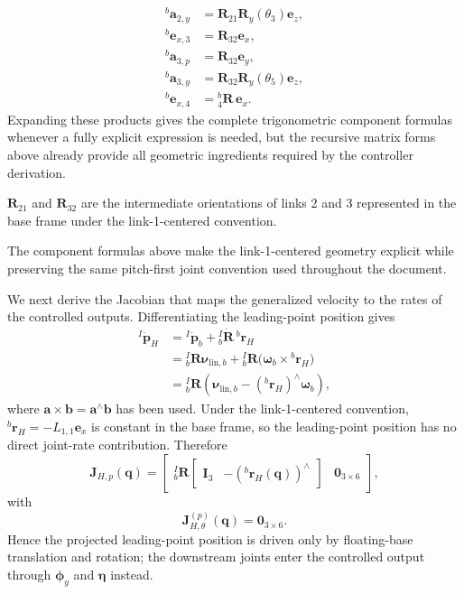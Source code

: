 \documentclass[12pt,a4paper]{report}
\newcommand{\newsymbols}[1]{\par\noindent{}#1\par\vspace{0.35em}}
\newcommand{\formulaannotation}[1]{\par\noindent{}#1\par\vspace{0.35em}}
\begin{document}
\begin{equation}
\begin{aligned}
{}^{b}\mathbf{a}_{2,y} &= \mathbf{R}_{21}\mathbf{R}_y(\theta_{3})\mathbf{e}_z, \\
{}^{b}\mathbf{e}_{x,3} &= \mathbf{R}_{32}\mathbf{e}_x, \\
{}^{b}\mathbf{a}_{3,p} &= \mathbf{R}_{32}\mathbf{e}_y, \\
{}^{b}\mathbf{a}_{3,y} &= \mathbf{R}_{32}\mathbf{R}_y(\theta_{5})\mathbf{e}_z, \\
{}^{b}\mathbf{e}_{x,4} &= {}_{4}^{b}\mathbf{R}\,\mathbf{e}_x.
\end{aligned}
\end{equation}
Expanding these products gives the complete trigonometric component formulas whenever a fully explicit expression is needed, but the recursive matrix forms above already provide all geometric ingredients required by the controller derivation.
\newsymbols{$\mathbf{R}_{21}$ and $\mathbf{R}_{32}$ are the intermediate orientations of links 2 and 3 represented in the base frame under the link-1-centered convention.}
\formulaannotation{The component formulas above make the link-1-centered geometry explicit while preserving the same pitch-first joint convention used throughout the document.}

We next derive the Jacobian that maps the generalized velocity to the rates of the controlled outputs. Differentiating the leading-point position gives
\begin{align}
{}^{I}\dot{\mathbf{p}}_H
&= {}^{I}\dot{\mathbf{p}}_b + {}_{b}^{I}\dot{\mathbf{R}}\,{}^{b}\mathbf{r}_H \\
&= {}_{b}^{I}\mathbf{R}\boldsymbol{\nu}_{\mathrm{lin},b} + {}_{b}^{I}\mathbf{R}\bigl(\boldsymbol{\omega}_b \times {}^{b}\mathbf{r}_H\bigr) \\
&= {}_{b}^{I}\mathbf{R}
\left(
\boldsymbol{\nu}_{\mathrm{lin},b} - ({}^{b}\mathbf{r}_H)^\wedge \boldsymbol{\omega}_b
\right),
\end{align}
where $\mathbf{a} \times \mathbf{b} = \mathbf{a}^\wedge \mathbf{b}$ has been used. Under the link-1-centered convention, ${}^{b}\mathbf{r}_H = -L_{1,1}\mathbf{e}_x$ is constant in the base frame, so the leading-point position has no direct joint-rate contribution. Therefore
\begin{equation}
\mathbf{J}_{H,p}(\mathbf{q}) =
\begin{bmatrix}
{}_{b}^{I}\mathbf{R}
\begin{bmatrix}
\mathbf{I}_3 & -({}^{b}\mathbf{r}_H(\mathbf{q}))^\wedge
\end{bmatrix}
&
\mathbf{0}_{3\times6}
\end{bmatrix},
\end{equation}
with
\begin{equation}
\mathbf{J}_{H,\theta}^{(p)}(\mathbf{q}) = \mathbf{0}_{3\times6}.
\end{equation}
Hence the projected leading-point position is driven only by floating-base translation and rotation; the downstream joints enter the controlled output through $\boldsymbol{\phi}_y$ and $\boldsymbol{\eta}$ instead.
\end{document}
